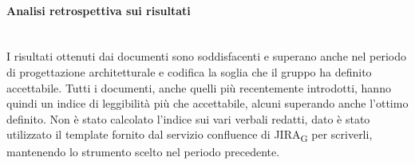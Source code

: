 \paragraph{Analisi retrospettiva sui risultati}\mbox{}\\
I risultati ottenuti dai documenti sono soddisfacenti e superano anche nel periodo di progettazione architetturale e codifica la soglia che il gruppo ha definito accettabile. Tutti i documenti, anche quelli più recentemente introdotti, hanno quindi un indice di leggibilità più che accettabile, alcuni superando anche l'ottimo definito. Non è stato calcolato l'indice sui vari verbali redatti, dato è stato utilizzato il template fornito dal servizio confluence di JIRA\textsubscript{G} per scriverli, mantenendo lo strumento scelto nel periodo precedente.
